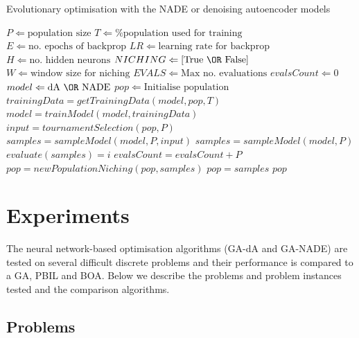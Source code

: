 \documentclass[twoside]{article}
\begin{document}
\begin{algorithm}                      %
\caption{Evolutionary optimisation with the NADE or denoising autoencoder models }          %
\label{alg1}                           %
\begin{algorithmic}                    %
    \STATE $P \Leftarrow \text{population size}$ 
    \STATE $T \Leftarrow \text{\% population used for training}$
    \STATE $E \Leftarrow \text{no. epochs of backprop}$
    \STATE $LR \Leftarrow \text{learning rate for backprop}$
    \STATE $H \Leftarrow \text{no. hidden neurons}$
    \STATE $NICHING \Leftarrow \text{[True \OR False]}$
    \STATE $W \Leftarrow \text{window size for niching}$
    \STATE $EVALS \Leftarrow \text{Max no. evaluations}$
    \STATE $evalsCount \Leftarrow \text{0}$
    \STATE $model \Leftarrow \text{dA \OR NADE}$ 
    \STATE $pop \Leftarrow \text{Initialise population}$
        \STATE $trainingData = getTrainingData(model,pop,T)$
        \STATE $model = trainModel(model,trainingData)$
            \STATE $input = tournamentSelection(pop,P)$
            \STATE $samples = sampleModel(model,P,input)$
        \ELSE
            \STATE $samples = sampleModel(model,P)$
        \ENDIF
        \STATE $evaluate(samples) = i$
        \STATE $evalsCount = evalsCount + P$
            \STATE $pop = newPopulationNiching(pop,samples)$
        \ELSE
            \STATE $pop = samples$
        \ENDIF
    \ENDWHILE
    \RETURN $pop$
\end{algorithmic}
\end{algorithm}
\section{Experiments}
\label{sec:experiments}
The neural network-based optimisation algorithms (GA-dA and GA-NADE) are tested on several difficult discrete problems and their performance is compared to a GA, PBIL and BOA. Below we describe the problems and problem instances tested and the comparison algorithms.
\subsection{Problems}
\label{sec:problems}
\end{document}
